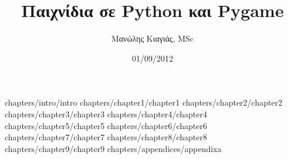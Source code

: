 \documentclass[a4paper,twoside,12pt,landscape]{book}
\author{Μανώλης Κιαγιάς, MSc}
\title{Παιχνίδια σε Python και Pygame}
\date{01/09/2012}
\begin{document}
\frontmatter
 {chapters/intro/intro}
\mainmatter
 {chapters/chapter1/chapter1}
 {chapters/chapter2/chapter2}
 {chapters/chapter3/chapter3}
 {chapters/chapter4/chapter4}
 {chapters/chapter5/chapter5}
 {chapters/chapter6/chapter6}
 {chapters/chapter7/chapter7}
 {chapters/chapter8/chapter8}
 {chapters/chapter9/chapter9}
\appendix
 {chapters/appendices/appendixa}
\end{document}

